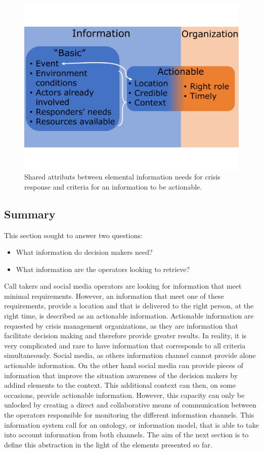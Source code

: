 \begin{figure}
    \centering
    \includegraphics[width=\textwidth]{figures/chap-3/sa-ainf.pdf}
    \caption{Shared attributs between elemental information needs for crisis response and criteria for an information to be actionable.}
    \label{information:sa-inf}
\end{figure}

\subsection*{Summary}
This section sought to answer two questions:

\begin{itemize}
    \item What information do decision makers need?
    \item What information are the operators looking to retrieve?
\end{itemize}

Call takers and social media operators are looking for information that meet minimal requirements.
However, an information that meet one of these requirements, provide a location and that is delivered
to the right person, at the right time, is described as an actionable information.
Actionable information are requested by crisis management organizations, as they are information that
facilitate decision making and therefore provide greater results.
In reality, it is very complicated and rare to have information that corresponds to all criteria simultaneously.
Social media, as others information channel cannot provide alone actionable information.
On the other hand social media can provide pieces of information that improve the situation
awareness of the decision makers by addind elements to the context.
This additional context can then, on some occasions, provide actionable information.
However, this capacity can only be unlocked by creating a direct and collaborative means
of communication between the operators responsible for monitoring the different information channels.
This information system call for an ontology, or information model, that is able to take
into account information from both channels.
The aim of the next section is to define this abstraction in the light of the elements
presented so far.

